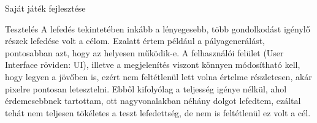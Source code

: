 \begin{MyChapter}{Saját játék fejlesztése}
\begin{MySection}{Tesztelés}
			A lefedés tekintetében inkább a lényegesebb, több gondolkodást igénylő részek lefedése volt a célom.
			Ezalatt értem például a pályagenerálást, pontosabban azt, hogy az helyesen működik-e. 
			A felhasználói felület (User Interface röviden: UI), illetve a megjelenítés viszont könnyen módosítható kell, hogy legyen a jövőben is, ezért nem feltétlenül lett volna értelme részletesen, akár pixelre pontosan letesztelni. 
			Ebből kifolyólag a teljesség igénye nélkül, ahol érdemesebbnek tartottam, ott nagyvonalakban néhány dolgot lefedtem, ezáltal tehát nem teljesen tökéletes a teszt lefedettség, de nem is feltétlenül ez volt a cél. 
			
	
		

\end{MySection}
\end{MyChapter}
